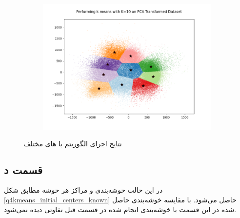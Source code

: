 \documentclass[12pt, a4paper]{article}
\begin{document}
\begin{figure}[h]
\begin{subfigure}{0.32\linewidth}
        \includegraphics[width=\linewidth]{images/q4/c/10.png}
    \end{subfigure}
    \caption{نتایج اجرای الگوریتم  با های مختلف}
    \label{q4kmeans}
\end{figure}

\subsection*{قسمت د} %

در این حالت خوشه‌بندی و مراکز هر خوشه مطابق شکل
\ref{q4kmeans_initial_centers_known} حاصل می‌شود.
با مقایسه خوشه‌بندی حاصل شده در این قسمت با خوشه‌بندی انجام شده در قسمت قبل
تفاوتی دیده نمی‌شود.
\end{document}
